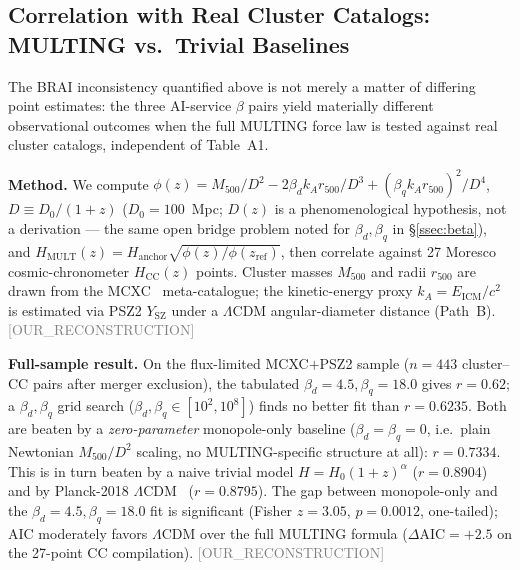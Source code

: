 \documentclass[twocolumn,prd,amsmath,amssymb,floatfix]{revtex4-2}
\newcommand{\reconstruction}{\textcolor{gray}{\small[OUR\_RECONSTRUCTION]}}
\begin{document}
\subsection{Correlation with Real Cluster Catalogs: MULTING vs.\ Trivial Baselines}
\label{ssec:pearson}

The BRAI inconsistency quantified above is not merely a matter of differing
point estimates: the three AI-service $\beta$ pairs yield materially
different observational outcomes when the full MULTING force law is tested
against real cluster catalogs, independent of Table~A1.

\textbf{Method.} We compute
$\phi(z) = M_{500}/D^2 - 2\beta_d k_A r_{500}/D^3 + (\beta_q k_A r_{500})^2/D^4$,
$D \equiv D_0/(1+z)$ ($D_0 = 100$~Mpc; $D(z)$ is a phenomenological hypothesis,
not a derivation --- the same open bridge problem noted for $\beta_d,\beta_q$
in \S\ref{ssec:beta}), and $H_\mathrm{MULT}(z) = H_\mathrm{anchor}
\sqrt{\phi(z)/\phi(z_\mathrm{ref})}$, then correlate against 27
Moresco~\cite{moresco2022} cosmic-chronometer $H_\mathrm{CC}(z)$ points.
Cluster masses $M_{500}$ and radii $r_{500}$ are drawn from the
MCXC~\cite{mcxc2011} meta-catalogue; the kinetic-energy proxy $k_A = E_\mathrm{ICM}/c^2$
is estimated via PSZ2 $Y_\mathrm{SZ}$ under a $\Lambda$CDM angular-diameter
distance (Path~B).
\reconstruction

\textbf{Full-sample result.} On the flux-limited MCXC$+$PSZ2 sample ($n=443$
cluster--CC pairs after merger exclusion), the tabulated $\beta_d=4.5,
\beta_q=18.0$ gives $r=0.62$; a $\beta_d,\beta_q$ grid search
($\beta_d,\beta_q \in [10^2,10^8]$) finds no better fit than $r=0.6235$.
Both are beaten by a \emph{zero-parameter} monopole-only baseline
($\beta_d=\beta_q=0$, i.e.\ plain Newtonian $M_{500}/D^2$ scaling, no
MULTING-specific structure at all): $r = 0.7334$. This is in turn beaten by
a naive trivial model $H = H_0(1+z)^\alpha$ ($r=0.8904$) and by Planck-2018
$\Lambda$CDM~\cite{planck2018} ($r=0.8795$). The gap between monopole-only
and the $\beta_d=4.5,\beta_q=18.0$ fit is significant
(Fisher $z=3.05$, $p=0.0012$, one-tailed); AIC moderately favors $\Lambda$CDM
over the full MULTING formula ($\Delta\mathrm{AIC}=+2.5$ on the 27-point CC
compilation).
\reconstruction
\end{document}
